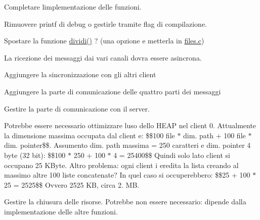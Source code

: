 
\begin{DoxyRefList}
\item[\label{todo__todo000001}%
\Hypertarget{todo__todo000001}%
File \hyperlink{client_8c}{client.c} ]Completare l\textquotesingle{}implementazione delle funzioni. 

Rimuovere printf di debug o gestirle tramite flag di compilazione. 

Spostare la funzione \hyperlink{client_8c_a55586f2b7e9b3620294cf78cda8abdad}{dividi()} ? (una opzione e\textquotesingle{} metterla in \hyperlink{files_8c}{files.\+c}) 
\item[\label{todo__todo000007}%
\Hypertarget{todo__todo000007}%
Globale \hyperlink{server_8c_a0ddf1224851353fc92bfbff6f499fa97}{main} (int argc, char $\ast$argv\mbox{[}\mbox{]})]La ricezione dei messaggi dai vari canali dovra\textquotesingle{} essere asincrona. 
\item[\label{todo__todo000005}%
\Hypertarget{todo__todo000005}%
Globale \hyperlink{client_8h_a54b47b58f228d7bc9827d2919687e25a}{operazioni\+\_\+figlio} (char $\ast$file\+Path)]Aggiungere la sincronizzazione con gli altri client

Aggiungere la parte di comunicazione delle quattro parti dei messaggi 
\item[\label{todo__todo000002}%
\Hypertarget{todo__todo000002}%
Globale \hyperlink{server_8c_a48d605ff689f470746c858648f0a98c2}{S\+I\+G\+I\+N\+T\+Signal\+Handler} (int sig)]Gestire la parte di comunicazione con il server.

Potrebbe essere necessario ottimizzare l\textquotesingle{}uso dello H\+E\+AP nel client 0. Attualmente la dimensione massima occupata dal client e\textquotesingle{}\+: \$\$100 file $\ast$ dim. path + 100 file $\ast$ dim. pointer\$\$. Assumento dim. path massima = 250 caratteri e dim. pointer 4 byte (32 bit)\+: \$\$100 $\ast$ 250 + 100 $\ast$ 4 = 25400\$\$ Quindi solo lato client si occupano 25 K\+Byte. Altro problema\+: ogni client i eredita la lista creando al massimo altre 100 liste concatenate? In quel caso si occuperebbero\+: \$\$25 + 100 $\ast$ 25 = 2525\$\$ Ovvero 2525 KB, circa 2. MB. 
\item[\label{todo__todo000004}%
\Hypertarget{todo__todo000004}%
Globale \hyperlink{client_8h_a50b22adcb76198fcd9402a97ff4711bf}{S\+I\+G\+U\+S\+R1\+Signal\+Handler} (int sig)]Gestire la chiusura delle risorse. Potrebbe non essere necessario\+: dipende dalla implementazione delle altre funzioni.
\end{DoxyRefList}